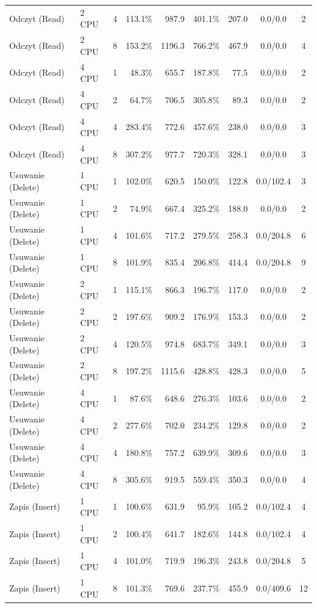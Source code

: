 \begin{table}[ht]
{\begin{tabular}{llcrrrrcc}
Odczyt (Read) & 2 CPU & 4 & 113.1\% & 987.9 & 401.1\% & 207.0 & 0.0/0.0 & 2 \\
Odczyt (Read) & 2 CPU & 8 & 153.2\% & 1196.3 & 766.2\% & 467.9 & 0.0/0.0 & 4 \\
Odczyt (Read) & 4 CPU & 1 & 48.3\% & 655.7 & 187.8\% & 77.5 & 0.0/0.0 & 2 \\
Odczyt (Read) & 4 CPU & 2 & 64.7\% & 706.5 & 305.8\% & 89.3 & 0.0/0.0 & 2 \\
Odczyt (Read) & 4 CPU & 4 & 283.4\% & 772.6 & 457.6\% & 238.0 & 0.0/0.0 & 3 \\
Odczyt (Read) & 4 CPU & 8 & 307.2\% & 977.7 & 720.3\% & 328.1 & 0.0/0.0 & 3 \\
Usuwanie (Delete) & 1 CPU & 1 & 102.0\% & 620.5 & 150.0\% & 122.8 & 0.0/102.4 & 3 \\
Usuwanie (Delete) & 1 CPU & 2 & 74.9\% & 667.4 & 325.2\% & 188.0 & 0.0/0.0 & 2 \\
Usuwanie (Delete) & 1 CPU & 4 & 101.6\% & 717.2 & 279.5\% & 258.3 & 0.0/204.8 & 6 \\
Usuwanie (Delete) & 1 CPU & 8 & 101.9\% & 835.4 & 206.8\% & 414.4 & 0.0/204.8 & 9 \\
Usuwanie (Delete) & 2 CPU & 1 & 115.1\% & 866.3 & 196.7\% & 117.0 & 0.0/0.0 & 2 \\
Usuwanie (Delete) & 2 CPU & 2 & 197.6\% & 909.2 & 176.9\% & 153.3 & 0.0/0.0 & 2 \\
Usuwanie (Delete) & 2 CPU & 4 & 120.5\% & 974.8 & 683.7\% & 349.1 & 0.0/0.0 & 3 \\
Usuwanie (Delete) & 2 CPU & 8 & 197.2\% & 1115.6 & 428.8\% & 428.3 & 0.0/0.0 & 5 \\
Usuwanie (Delete) & 4 CPU & 1 & 87.6\% & 648.6 & 276.3\% & 103.6 & 0.0/0.0 & 2 \\
Usuwanie (Delete) & 4 CPU & 2 & 277.6\% & 702.0 & 234.2\% & 129.8 & 0.0/0.0 & 2 \\
Usuwanie (Delete) & 4 CPU & 4 & 180.8\% & 757.2 & 639.9\% & 309.6 & 0.0/0.0 & 3 \\
Usuwanie (Delete) & 4 CPU & 8 & 305.6\% & 919.5 & 559.4\% & 350.3 & 0.0/0.0 & 4 \\
Zapis (Insert) & 1 CPU & 1 & 100.6\% & 631.9 & 95.9\% & 105.2 & 0.0/102.4 & 4 \\
Zapis (Insert) & 1 CPU & 2 & 100.4\% & 641.7 & 182.6\% & 144.8 & 0.0/102.4 & 4 \\
Zapis (Insert) & 1 CPU & 4 & 101.0\% & 719.9 & 196.3\% & 243.8 & 0.0/204.8 & 5 \\
Zapis (Insert) & 1 CPU & 8 & 101.3\% & 769.6 & 237.7\% & 455.9 & 0.0/409.6 & 12 \\

\end{tabular}}
\end{table}
